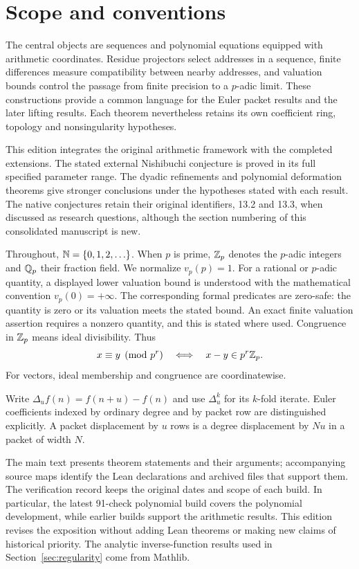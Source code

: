\section{Scope and conventions}
\label{sec:scope}
The central objects are sequences and polynomial equations equipped with
arithmetic coordinates. Residue projectors select addresses in a sequence,
finite differences measure compatibility between nearby addresses, and
valuation bounds control the passage from finite precision to a $p$-adic
limit. These constructions provide a common language for the Euler packet
results and the later lifting results. Each theorem nevertheless retains its
own coefficient ring, topology and nonsingularity hypotheses.

This edition integrates the original arithmetic framework with the completed
extensions. The stated external Nishibuchi conjecture is proved in its full
specified parameter range. The dyadic refinements and polynomial deformation theorems give stronger
conclusions under the hypotheses stated with each result. The native conjectures retain their original
identifiers, 13.2 and 13.3, when discussed as research questions, although the
section numbering of this consolidated manuscript is new.

Throughout, $\mathbb N=\{0,1,2,\ldots\}$. When $p$ is prime, $\mathbb Z_p$ denotes the
$p$-adic integers and $\mathbb Q_p$ their fraction field. We normalize $v_p(p)=1$.
For a rational or $p$-adic quantity, a displayed lower valuation bound is
understood with the mathematical convention $v_p(0)=+\infty$.
The corresponding formal predicates are zero-safe: the quantity is zero or
its valuation meets the stated bound. An exact finite valuation assertion
requires a nonzero quantity, and this is stated where used. Congruence in
$\mathbb Z_p$ means ideal divisibility. Thus
\[
 x\equiv y\pmod{p^r}\quad\Longleftrightarrow\quad
 x-y\in p^r\mathbb Z_p.
\]
For vectors, ideal membership and congruence are coordinatewise.

Write $\Delta_u f(n)=f(n+u)-f(n)$ and use $\Delta_u^k$ for its $k$-fold
iterate. Euler coefficients indexed by ordinary degree and by packet row are
distinguished explicitly. A packet displacement by $u$ rows is a degree
displacement by $Nu$ in a packet of width $N$.

The main text presents theorem statements and their arguments; accompanying
source maps identify the Lean declarations and archived files that support
them. The verification record keeps the original dates and scope of each
build. In particular, the latest 91-check polynomial build covers the
polynomial development, while earlier builds support the arithmetic results.
This edition revises the exposition without adding Lean theorems or making
new claims of historical priority. The analytic inverse-function results
used in Section~\ref{sec:regularity} come from Mathlib.
